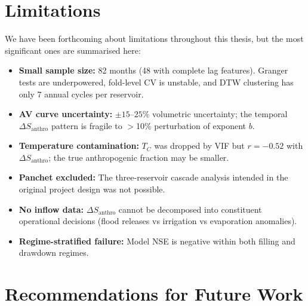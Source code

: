 \documentclass[12pt,a4paper,oneside]{report}
\newcommand{\dSanthro}{\Delta S_{\mathrm{anthro}}}
\begin{document}
\section{Limitations}

We have been forthcoming about limitations throughout this thesis, but
the most significant ones are summarised here:

\begin{itemize}[leftmargin=*]
  \item \textbf{Small sample size:} 82 months (48 with complete lag
    features). Granger tests are underpowered, fold-level CV is unstable,
    and DTW clustering has only 7 annual cycles per reservoir.
  \item \textbf{AV curve uncertainty:} $\pm 15$--$25$\% volumetric
    uncertainty; the temporal $\dSanthro$ pattern is fragile to $>$10\% perturbation
    of exponent $b$.
  \item \textbf{Temperature contamination:} $T_C$ was dropped by VIF but
    $r = -0.52$ with $\dSanthro$; the true anthropogenic fraction may be smaller.
  \item \textbf{Panchet excluded:} The three-reservoir cascade analysis
    intended in the original project design was not possible.
  \item \textbf{No inflow data:} $\dSanthro$ cannot be decomposed into
    constituent operational decisions (flood releases vs irrigation vs
    evaporation anomalies).
  \item \textbf{Regime-stratified failure:} Model NSE is negative within
    both filling and drawdown regimes.
\end{itemize}

\section{Recommendations for Future Work}
\end{document}
